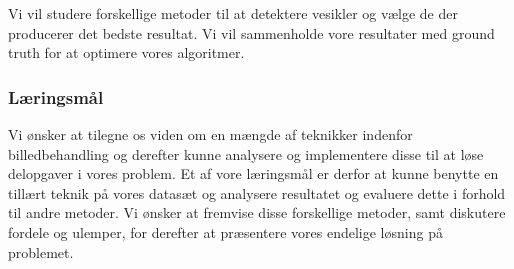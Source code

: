 Vi vil studere forskellige metoder til at detektere vesikler og vælge de der producerer det bedste resultat. Vi vil sammenholde vore resultater med ground truth for at optimere vores algoritmer.

\subsubsection*{Læringsmål}
Vi ønsker at tilegne os viden om en mængde af teknikker indenfor billedbehandling og derefter kunne analysere og implementere disse til at løse delopgaver i vores problem. Et af vore læringsmål er derfor at kunne benytte en tillært teknik på vores datasæt og analysere resultatet og evaluere dette i forhold til andre metoder. Vi ønsker at fremvise disse forskellige metoder, samt diskutere fordele og ulemper, for derefter at præsentere vores endelige løsning på problemet.


